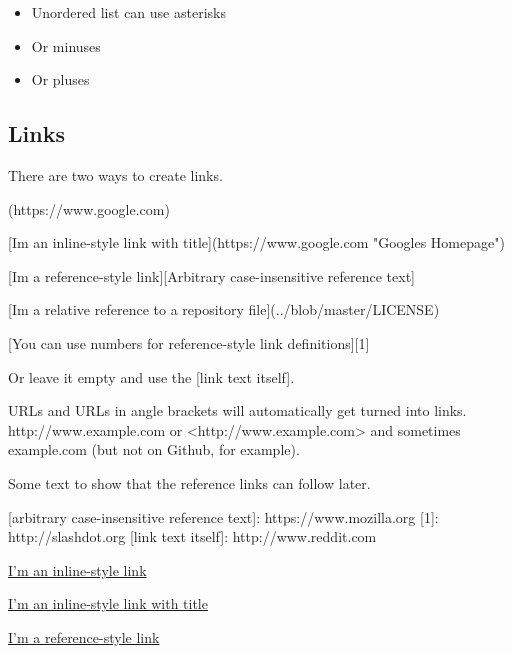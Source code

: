 \documentclass[
]{article}
\newenvironment{Shaded}{}{}
\newcommand{\NormalTok}[1]{#1}
\providecommand{\tightlist}{%
  \setlength{\itemsep}{0pt}\setlength{\parskip}{0pt}}
\begin{document}
\begin{itemize}
\tightlist
\item
  Unordered list can use asterisks
\item
  Or minuses
\item
  Or pluses
\end{itemize}

\subsection{Links}\label{links}

There are two ways to create links.

\begin{Shaded}
\begin{Highlighting}[]
\NormalTok{[I\textquotesingle{}m an inline{-}style link](https://www.google.com)}

\NormalTok{[I\textquotesingle{}m an inline{-}style link with title](https://www.google.com "Google\textquotesingle{}s Homepage")}

\NormalTok{[I\textquotesingle{}m a reference{-}style link][Arbitrary case{-}insensitive reference text]}

\NormalTok{[I\textquotesingle{}m a relative reference to a repository file](../blob/master/LICENSE)}

\NormalTok{[You can use numbers for reference{-}style link definitions][1]}

\NormalTok{Or leave it empty and use the [link text itself].}

\NormalTok{URLs and URLs in angle brackets will automatically get turned into links.}
\NormalTok{http://www.example.com or \textless{}http://www.example.com\textgreater{} and sometimes}
\NormalTok{example.com (but not on Github, for example).}

\NormalTok{Some text to show that the reference links can follow later.}

\NormalTok{[arbitrary case{-}insensitive reference text]: https://www.mozilla.org}
\NormalTok{[1]: http://slashdot.org}
\NormalTok{[link text itself]: http://www.reddit.com}
\end{Highlighting}
\end{Shaded}

\href{https://www.google.com}{I'm an inline-style link}

\href{https://www.google.com}{I'm an inline-style link with title}

\href{https://www.mozilla.org}{I'm a reference-style link}
\end{document}
